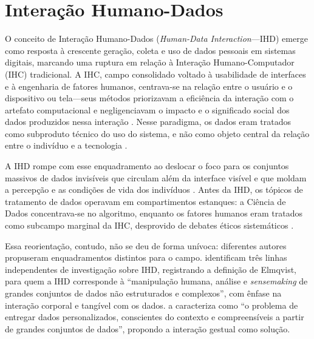 \documentclass[
	12pt,				%
	oneside,			%
	a4paper,			%
	english,			%
	brazil				%
	]{abntex2ppgsi}
\begin{document}
   \section{Interação Humano-Dados}\label{sec:referencial}

    O conceito de Interação Humano-Dados (\textit{Human-Data Interaction}---IHD) emerge como resposta à crescente geração, coleta e uso de dados pessoais em sistemas digitais, marcando uma ruptura em relação à Interação Humano-Computador (IHC) tradicional. A IHC, campo consolidado voltado à usabilidade de interfaces e à engenharia de fatores humanos, centrava-se na relação entre o usuário e o dispositivo ou tela---seus métodos priorizavam a eficiência da interação com o artefato computacional e negligenciavam o impacto e o significado social dos dados produzidos nessa interação \cite{Strey2019Human, Belizario2023Interacao}. Nesse paradigma, os dados eram tratados como subproduto técnico do uso do sistema, e não como objeto central da relação entre o indivíduo e a tecnologia \cite{Calvetti2021173}.

    A IHD rompe com esse enquadramento ao deslocar o foco para os conjuntos massivos de dados invisíveis que circulam além da interface visível e que moldam a percepção e as condições de vida dos indivíduos \cite{Parviainen2016}. Antes da IHD, os tópicos de tratamento de dados operavam em compartimentos estanques: a Ciência de Dados concentrava-se no algoritmo, enquanto os fatores humanos eram tratados como subcampo marginal da IHC, desprovido de debates éticos sistemáticos \cite{Belizario2023Interacao}.

    Essa reorientação, contudo, não se deu de forma unívoca: diferentes autores propuseram enquadramentos distintos para o campo.  identificam três linhas independentes de investigação sobre IHD, registrando a definição de Elmqvist, para quem a IHD corresponde à ``manipulação humana, análise e \textit{sensemaking} de grandes conjuntos de dados não estruturados e complexos'', com ênfase na interação corporal e tangível com os dados.  a caracteriza como ``o problema de entregar dados personalizados, conscientes do contexto e compreensíveis a partir de grandes conjuntos de dados'', propondo a interação gestual como solução.
\end{document}
